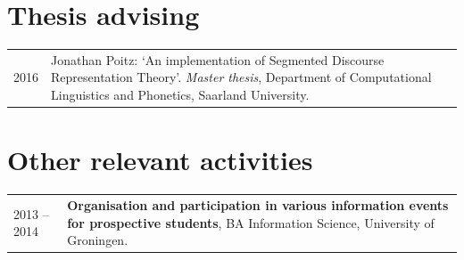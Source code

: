 \documentclass[a4paper,10pt]{article}
\def\leftcolwidth{.12\textwidth}
\def\tablevspace{10pt}
\begin{document}

\section*{Thesis advising}

\noindent
\begin{tabularx}{\textwidth}{ p{\leftcolwidth} X }
  2016
  & Jonathan Poitz: `An implementation of Segmented Discourse
    Representation Theory'. \textit{Master thesis}, Department of Computational
    Linguistics and Phonetics, Saarland University.\\
\end{tabularx}




\section*{Other relevant activities}

%

\noindent
\begin{tabularx}{\textwidth}{ p{\leftcolwidth} X }
  2013 -- 2014
  & \textbf{Organisation and participation in various information events for
    prospective students}, BA Information Science, University of Groningen.\\
\end{tabularx}
\end{document}

